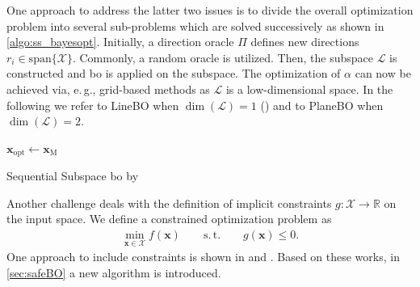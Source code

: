 \documentclass{ifacconf}
\newcommand{\eg}{e.\,g., }
\begin{document}
One approach to address the latter two issues is to divide the overall optimization problem into several sub-problems which are solved successively as shown in \cref{algo:ss_bayesopt}.
Initially, a direction oracle \(\Pi\) defines new directions \(r_i \in \mathrm{span}\{\mathcal{X}\}\). Commonly, a random oracle is utilized. Then, the subspace \(\mathcal{L}\) is constructed and \gls{bo} is applied on the subspace.
The optimization of \(\alpha\) can now be achieved via, \eg grid-based methods as \(\mathcal{L}\) is a low-dimensional space. In the following we refer to LineBO when \(\dim(\mathcal{L}) = 1\) (\cite{lineBO}) and to PlaneBO when \(\dim(\mathcal{L}) = 2\). 

\IncMargin{1.5em}
\begin{algorithm2e}[t]
 \DontPrintSemicolon
    
    \(\bm{x}_\mathrm{opt} \leftarrow \bm{x}_{\mathrm{M}}\)
    \caption{Sequential Subspace \acrlong{bo} by \cite{lineBO} \label{algo:ss_bayesopt}}
\end{algorithm2e}

Another challenge deals with the definition of implicit constraints \(g:\mathcal{X} \longrightarrow \mathbb{R}\) on the input space. We define a constrained optimization problem as
\begin{align}
    \min_{\bm{x}\in\mathcal{X}} f(\bm{x}) \mathrm{\qquad s.\,t.\qquad} g(\bm{x})\leq 0.
\end{align}
One approach to include constraints is shown in \cite{safeopt1} and \cite{safeoptberkenkamp}. Based on these works, in \cref{sec:safeBO} a new algorithm is introduced.


\end{document}
